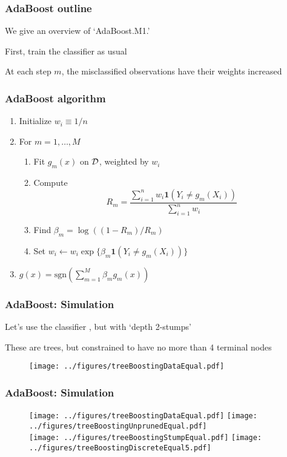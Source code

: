 \documentclass[12pt]{beamer}
\begin{document}
\begin{frame}[fragile]
\frametitle{AdaBoost outline}
We give an overview of `AdaBoost.M1.' 


\vsp
First, train the classifier as usual


\vsp
At each step $m$, the misclassified observations have their weights increased

\end{frame}

\begin{frame}[fragile]
\frametitle{AdaBoost algorithm}
\begin{enumerate}
\item Initialize $w_i \equiv 1/n$
\item For $m = 1,\ldots,M$
\begin{enumerate}
\item Fit $g_m(x)$ on $\mathcal{D}$, weighted by $w_i$
\item Compute
\[
R_m = \frac{\sum_{i=1}^n w_i \mathbf{1}(Y_i \neq g_m(X_i))}{\sum_{i=1}^n w_i}
\]

\item Find $\beta_m = \log((1-R_m)/R_m)$
\item Set $w_i \leftarrow w_i\exp\{\beta_m \mathbf{1}(Y_i \neq g_m(X_i))\}$
\end{enumerate}
\item {} $g(x) = \textrm{sgn}\left(\sum_{m=1}^M \beta_m g_m(x)\right)$
\end{enumerate}
\end{frame}

\begin{frame}[fragile]
\frametitle{AdaBoost: Simulation}
Let's use the classifier , but with `depth 2-stumps'

\vsp
These are trees, but constrained to have no more than 4 terminal nodes

\begin{figure}
\texttt{[image: ../figures/treeBoostingDataEqual.pdf]}
\end{figure}
\end{frame}

\begin{frame}[fragile]
\frametitle{AdaBoost: Simulation}
\begin{figure}
\texttt{[image: ../figures/treeBoostingDataEqual.pdf]}
\texttt{[image: ../figures/treeBoostingUnprunedEqual.pdf]} \\
\texttt{[image: ../figures/treeBoostingStumpEqual.pdf]}
\texttt{[image: ../figures/treeBoostingDiscreteEqual5.pdf]}
\end{figure}
\end{frame}
\end{document}

